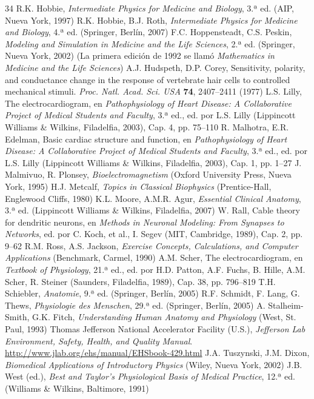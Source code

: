 \documentclass[12pt]{book}
\begin{document}
\begin{thebibliography}{34}
 R.K. Hobbie, \textit{Intermediate Physics for Medicine and Biology}, 3.ª ed. (AIP, Nueva York, 1997)
 R.K. Hobbie, B.J. Roth, \textit{Intermediate Physics for Medicine and Biology}, 4.ª ed. (Springer, Berlín, 2007)
 F.C. Hoppensteadt, C.S. Peskin, \textit{Modeling and Simulation in Medicine and the Life Sciences}, 2.ª ed. (Springer, Nueva York, 2002) (La primera edición de 1992 se llamó \textit{Mathematics in Medicine and the Life Sciences})
 A.J. Hudspeth, D.P. Corey, Sensitivity, polarity, and conductance change in the response of vertebrate hair cells to controlled mechanical stimuli. \textit{Proc. Natl. Acad. Sci. USA} \textbf{74}, 2407--2411 (1977)
 L.S. Lilly, The electrocardiogram, en \textit{Pathophysiology of Heart Disease: A Collaborative Project of Medical Students and Faculty}, 3.ª ed., ed. por L.S. Lilly (Lippincott Williams \& Wilkins, Filadelfia, 2003), Cap. 4, pp. 75--110
 R. Malhotra, E.R. Edelman, Basic cardiac structure and function, en \textit{Pathophysiology of Heart Disease: A Collaborative Project of Medical Students and Faculty}, 3.ª ed., ed. por L.S. Lilly (Lippincott Williams \& Wilkins, Filadelfia, 2003), Cap. 1, pp. 1--27
 J. Malmivuo, R. Plonsey, \textit{Bioelectromagnetism} (Oxford University Press, Nueva York, 1995)
 H.J. Metcalf, \textit{Topics in Classical Biophysics} (Prentice-Hall, Englewood Cliffs, 1980)
 K.L. Moore, A.M.R. Agur, \textit{Essential Clinical Anatomy}, 3.ª ed. (Lippincott Williams \& Wilkins, Filadelfia, 2007)
 W. Rall, Cable theory for dendritic neurons, en \textit{Methods in Neuronal Modeling: From Synapses to Networks}, ed. por C. Koch, et al., I. Segev (MIT, Cambridge, 1989), Cap. 2, pp. 9--62
 R.M. Ross, A.S. Jackson, \textit{Exercise Concepts, Calculations, and Computer Applications} (Benchmark, Carmel, 1990)
 A.M. Scher, The electrocardiogram, en \textit{Textbook of Physiology}, 21.ª ed., ed. por H.D. Patton, A.F. Fuchs, B. Hille, A.M. Scher, R. Steiner (Saunders, Filadelfia, 1989), Cap. 38, pp. 796--819
 T.H. Schiebler, \textit{Anatomie}, 9.ª ed. (Springer, Berlín, 2005)
 R.F. Schmidt, F. Lang, G. Thews, \textit{Physiologie des Menschen}, 29.ª ed. (Springer, Berlín, 2005)
 A. Stalheim-Smith, G.K. Fitch, \textit{Understanding Human Anatomy and Physiology} (West, St. Paul, 1993)
 Thomas Jefferson National Accelerator Facility (U.S.), \textit{Jefferson Lab Environment, Safety, Health, and Quality Manual}. \url{http://www.jlab.org/ehs/manual/EHSbook-429.html}
 J.A. Tuszynski, J.M. Dixon, \textit{Biomedical Applications of Introductory Physics} (Wiley, Nueva York, 2002)
 J.B. West (ed.), \textit{Best and Taylor's Physiological Basis of Medical Practice}, 12.ª ed. (Williams \& Wilkins, Baltimore, 1991)
\end{thebibliography}

\end{document}
